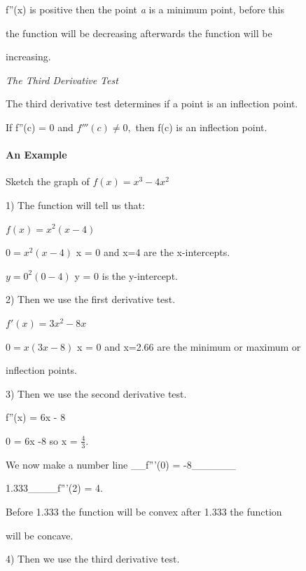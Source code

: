 f''(x) is positive then the point \textit{a} is a minimum point, before this

the function will be decreasing afterwards the function will be

increasing.



\textit{The Third Derivative Test}



The third derivative test determines if a point is an inflection point.

If f''(c) = 0 and $f'''(c) \ne 0,$ then f(c) is an inflection point.



\paragraph{An Example}



Sketch the graph of $f(x) = x^3 -4x^2$



1) The function will tell us that:



$f(x) = x^2(x - 4)$

$0 = x^2(x - 4)$ x = 0 and x=4 are the x-intercepts.

$y = 0^2(0 - 4)$ y = 0 is the y-intercept.



2) Then we use the first derivative test.



$f'(x) = 3x^2 - 8x$

$0 = x(3x - 8)$ x = 0 and x=2.66 are the minimum or maximum or

    inflection points.



3) Then we use the second derivative test.



f''(x) = 6x - 8

0 = 6x -8 so x = $\frac{4}{3}.$

We now make a number line \_\_f'''(0) = -8\_\_\_\_\_\_

    1.333\_\_\_\_f'''(2) = 4.

Before 1.333 the function will be convex after 1.333 the function

    will be concave.



4) Then we use the third derivative test.



